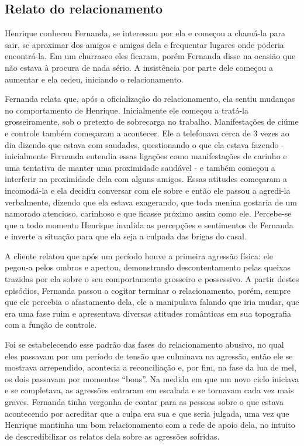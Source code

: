 \subsection{Relato do relacionamento}

Henrique conheceu Fernanda, se interessou por ela e começou a chamá-la para sair, se aproximar dos amigos e amigas dela e frequentar lugares onde poderia encontrá-la. Em um churrasco eles ficaram, porém Fernanda disse na ocasião que não estava à procura de nada sério. A insistência por parte dele começou a aumentar e ela cedeu, iniciando o relacionamento.

Fernanda relata que, após a oficialização do relacionamento, ela sentiu mudanças no comportamento de Henrique. Inicialmente ele começou a tratá-la grosseiramente, sob o pretexto de sobrecarga no trabalho. Manifestações de ciúme e controle também começaram a acontecer. Ele a telefonava cerca de 3 vezes ao dia dizendo que estava com saudades, questionando o que ela estava fazendo - inicialmente Fernanda entendia essas ligações como manifestações de carinho e uma tentativa de manter uma proximidade saudável - e também começou a interferir na proximidade dela com alguns amigos. Essas atitudes começaram a incomodá-la e ela decidiu conversar com ele sobre e então ele passou a agredi-la verbalmente, dizendo que ela estava exagerando, que toda menina gostaria de um namorado atencioso, carinhoso e que ficasse próximo assim como ele. Percebe-se que a todo momento Henrique invalida as percepções e sentimentos de Fernanda e inverte a situação para que ela seja a culpada das brigas do casal.

A cliente relatou que após um período houve a primeira agressão física: ele pegou-a pelos ombros e apertou, demonstrando descontentamento pelas queixas trazidas por ela sobre o seu comportamento grosseiro e possessivo. A partir destes episódios, Fernanda passou a cogitar terminar o relacionamento, porém, sempre que ele percebia o afastamento dela, ele a manipulava falando que iria mudar, que era uma fase ruim e apresentava diversas atitudes românticas em sua topografia com a função de controle.

Foi se estabelecendo esse padrão das fases do relacionamento abusivo, no qual eles passavam por um período de tensão que culminava na agressão, então ele se mostrava arrependido, acontecia a reconciliação e, por fim, na fase da lua de mel, os dois passavam por momentos “bons”. Na medida em que um novo ciclo iniciava e se completava, as agressões entraram em escalada e se tornavam cada vez mais graves. Fernanda tinha vergonha de contar para as pessoas sobre o que estava acontecendo por acreditar que a culpa era sua e que seria julgada, uma vez que Henrique mantinha um bom relacionamento com a rede de apoio dela, no intuito de descredibilizar os relatos dela sobre as agressões sofridas. 


